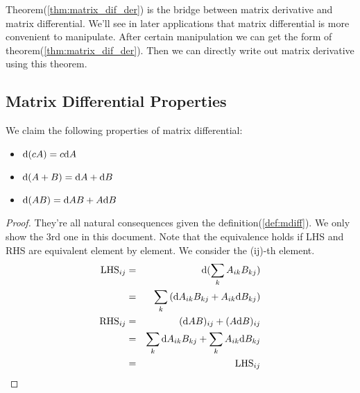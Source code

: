 Theorem(\ref{thm:matrix_dif_der}) is the bridge between matrix 
derivative and matrix differential. We'll see in later applications 
that matrix differential is more convenient to manipulate. 
After certain manipulation we can get the form of theorem(\ref{thm:matrix_dif_der}). 
Then we can directly write out matrix derivative using this theorem. 

\subsection{Matrix Differential Properties}

\begin{mythm}
	\label{thm:mdiff_prop}
	We claim the following properties of matrix differential:
	\begin{itemize}
		\item $\mathrm{d}(cA) = c \mathrm{d}A$
		\item $\mathrm{d}(A+B) = \mathrm{d}A + \mathrm{d}B$
		\item $\mathrm{d}(AB) = \mathrm{d}A B + A \mathrm{d}B$
	\end{itemize}
\end{mythm}

\begin{proof}
	They're all natural consequences given the definition(\ref{def:mdiff}). 
	We only show the 3rd one in this document. Note that the equivalence 
	holds if LHS and RHS are equivalent element by element. We consider 
	the (ij)-th element. 
	\begin{eqnarray}
		\text{LHS}_{ij} &=& \mathrm{d}(\sum_{k}{A_{ik}B_{kj}}) \\
		&=& \sum_{k}{(\mathrm{d}A_{ik}B_{kj} + A_{ik} \mathrm{d}B_{kj})} \\
		\text{RHS}_{ij} &=& (\mathrm{d}A B)_{ij} + (A \mathrm{d}B)_{ij} \\
		&=& \sum_{k}{\mathrm{d}A_{ik}B_{kj}} + \sum_{k}{A_{ik}\mathrm{d}B_{kj}} \\
		&=& \text{LHS}_{ij}
	\end{eqnarray}
\end{proof}

